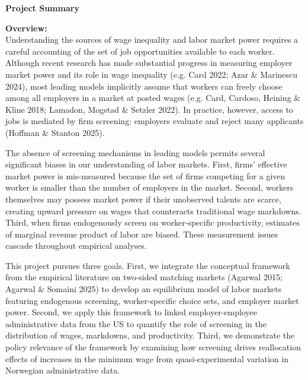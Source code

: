 \documentclass[11pt]{article}
\begin{document}
\begin{center}
{\centering \large \textbf{Project Summary%
}}
\end{center}

\noindent
\textbf{Overview:}\\
Understanding the sources of wage inequality and labor market power requires a careful accounting of the set of job opportunities available to each worker. Although recent research has made substantial progress in measuring employer market power and its role in wage inequality (e.g. Card 2022; Azar \& Marinescu 2024), most leading models implicitly assume that workers can freely choose among all employers in a market at posted wages (e.g. Card, Cardoso, Heining \& Kline 2018; Lamadon, Mogstad \& Setzler 2022). In practice, however, access to jobs is mediated by firm screening: employers evaluate and reject many applicants (Hoffman \& Stanton 2025).

The absence of screening mechanisms in leading models permits several significant biases in our understanding of labor markets. First, firms' effective market power is mis-measured because the set of firms competing for a given worker is smaller than the number of employers in the market. Second, workers themselves may possess market power if their unobserved talents are scarce, creating upward pressure on wages that counteracts traditional wage markdowns. Third, when firms endogenously screen on worker-specific productivity, estimates of marginal revenue product of labor are biased. These measurement issues cascade throughout empirical analyses.

This project pursues three goals. First, we integrate the conceptual framework from the empirical literature on two-sided matching markets (Agarwal 2015; Agarwal \& Somaini 2025) to develop an equilibrium model of labor markets featuring endogenous screening, worker-specific choice sets, and employer market power. Second, we apply this framework to linked employer-employee administrative data from the US to quantify the role of screening in the distribution of wages, markdowns, and productivity. Third, we demonstrate the policy relevance of the framework by examining how screening drives reallocation effects of increases in the minimum wage from quasi-experimental variation in Norwegian administrative data. 
\end{document}
